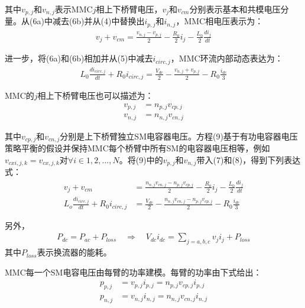   其中$v_{p, j}$和$v_{n, j}$表示MMC$j$相上下桥臂电压，$v_j$和$v_{cm}$分别表示基本和共模电压分量。从(6a)中减去(6b)并从(4)中替换出$i_{p, j}$和$i_{n, j}$，MMC相电压表示为：
\begin{align*}
v_{j}+v_{cm} = \frac{v_{n, j}-v_{p, j}}{2}-\frac{R_0}{2}i_j-\frac{L_0}{2}\frac{di_j}{dt}\tag{7}
\end{align*}

  进一步，将(6a)和(6b)相加并从(5)中减去$i_{circ, j}$，MMC环流内部动态表达为：
\begin{align*}
L_0\frac{di_{circ, j}}{dt}+R_0i_{circ, j} = \frac{V_{dc}}{2}-\frac{v_{n, j}+v_{p, j}}{2}-R_0\frac{i_{dc}}{3}\tag{8}
\end{align*}

  MMC的$j$相上下桥臂电压也可以描述为：
\begin{align*}
v_{p, j} &= n_{p, j}v_{cp, j}\tag{9a}\\
v_{n, j} &= n_{n, j}v_{cn, j}\tag{9b}
\end{align*}
  
  其中$v_{cp, j}$和$v_{cn, j}$分别是上下桥臂独立SM电容器电压。方程(9)基于有功电容器电压策略平衡的假设并保持MMC每个桥臂中所有SM的电容器电压相等，例如$v_{cxi, j, k} = v_{cx, j, k}$对$\forall i\in{1, 2, ..., N}$。将(9)中的$v_{p, j}$和$v_{n, j}$带入(7)和(8)，得到下列表达式：
\begin{align*}
v_{j} + v_{cm} &= \frac{n_{n, j}v_{cn, j}-n_{p, j}v_{cp, j}}{2}-\frac{R_0}{2}i_j-\frac{L_0}{2}\frac{di_j}{dt}\tag{10a}\\
L_o\frac{di_{circ, j}}{dt} + R_0i_{circ, j} &= \frac{V_{dc}}{2} - \frac{n_{n, j}v_{cn, j}-n_{p, j}v_{cp, j}}{2} - R_0\frac{i_{dc}}{3}\tag{10b}
\end{align*}

  另外，
\begin{align*}
P_{dc} = P_{ac} + P_{loss} \quad \Rightarrow \quad V_{dc}i_{dc} = \sum_{j = a, b, c}v_ji_j + P_{loss}\tag{11}
\end{align*}
其中$P_{loss}$表示换流器的能耗。

  MMC每一个SM电容电压由每臂的功率建模。每臂的功率由下式给出：
\begin{align*}
p_{p, j} &= v_{p, j}i_{p, j} = n_{p, j}v_{cp, j}i_{p, j}\tag{12a}\\
p_{n, j} &= v_{n, j}i_{n, j} = n_{n, j}v_{cn, j}i_{n, j}\tag{12b}
\end{align*}
  
